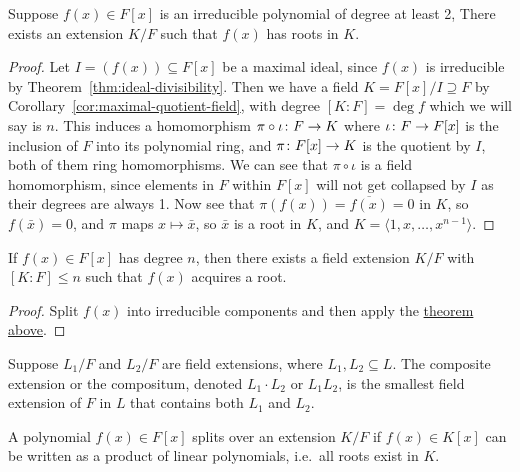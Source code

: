 \begin{theorem}\label{thm:field-extension-gain-root}
    Suppose \(f(x) \in F[x]\) is an irreducible polynomial of degree at least 2,
    There exists an extension \(K/F\) such that \(f(x)\) has roots in \(K\).
\end{theorem}
\begin{proof}
    Let \(I = (f(x)) \subseteq F[x]\) be a maximal ideal,
    since \(f(x)\) is irreducible by Theorem~\ref{thm:ideal-divisibility}.
    Then we have a field \(K = F[x]/I \supseteq F\)
    by Corollary~\ref{cor:maximal-quotient-field},
    with degree \([K:F] = \deg f\) which we will say is \(n\).
    This induces a homomorphism \(\pi\circ\iota\colon F\to K\)
    where \(\iota\colon F\to F[x]\) is the inclusion of \(F\) into its polynomial ring,
    and \(\pi\colon F[x]\to K\) is the quotient by \(I\),
    both of them ring homomorphisms.
    We can see that \(\pi\circ\iota\) is a field homomorphism,
    since elements in \(F\) within \(F[x]\) will not get collapsed by \(I\)
    as their degrees are always 1.
    Now see that \(\pi(f(x)) = \overline{f(x)} = 0\) in \(K\),
    so \(f(\bar{x}) = 0\), and \(\pi\) maps \(x \mapsto \bar{x}\),
    so \(\bar{x}\) is a root in \(K\),
    and \(K = \langle 1, x, \hdots, x^{n-1} \rangle\).
\end{proof}
\begin{corollary}
    If \(f(x) \in F[x]\) has degree \(n\),
    then there exists a field extension \(K/F\)
    with \([K:F] \leq n\) such that \(f(x)\) acquires a root.
\end{corollary}
\begin{proof}
    Split \(f(x)\) into irreducible components
    and then apply the \hyperref[thm:field-extension-gain-root]{theorem above}.
\end{proof}

\begin{definition}
    Suppose \(L_1/F\) and \(L_2/F\) are field extensions,
    where \(L_1,L_2 \subseteq L\).
    The composite extension or the compositum,
    denoted \(L_1 \cdot L_2\) or \(L_1 L_2\),
    is the smallest field extension of \(F\) in \(L\)
    that contains both \(L_1\) and \(L_2\).
\end{definition}

\begin{definition}
    A polynomial \(f(x) \in F[x]\) splits over an extension \(K/F\)
    if \(f(x) \in K[x]\) can be written as a product of linear polynomials,
    i.e.\ all roots exist in \(K\).
\end{definition}

